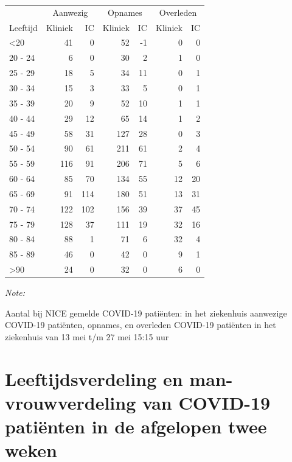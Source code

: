\documentclass[
  english,
  man,floatsintext]{apa6}
\begin{document}
\begin{table}
\centering\begingroup\fontsize{10}{12}\selectfont

\begin{threeparttable}
\begin{tabular}{lrrrrrr}
\toprule
\multicolumn{1}{c}{ } & \multicolumn{2}{c}{Aanwezig} & \multicolumn{2}{c}{Opnames} & \multicolumn{2}{c}{Overleden} \\
\cmidrule(l{3pt}r{3pt}){2-3} \cmidrule(l{3pt}r{3pt}){4-5} \cmidrule(l{3pt}r{3pt}){6-7}
Leeftijd & Kliniek & IC & Kliniek & IC & Kliniek & IC\\
\midrule
<20 & 41 & 0 & 52 & -1 & 0 & 0\\
20 - 24 & 6 & 0 & 30 & 2 & 1 & 0\\
25 - 29 & 18 & 5 & 34 & 11 & 0 & 1\\
30 - 34 & 15 & 3 & 33 & 5 & 0 & 1\\
35 - 39 & 20 & 9 & 52 & 10 & 1 & 1\\
40 - 44 & 29 & 12 & 65 & 14 & 1 & 2\\
45 - 49 & 58 & 31 & 127 & 28 & 0 & 3\\
50 - 54 & 90 & 61 & 211 & 61 & 2 & 4\\
55 - 59 & 116 & 91 & 206 & 71 & 5 & 6\\
60 - 64 & 85 & 70 & 134 & 55 & 12 & 20\\
65 - 69 & 91 & 114 & 180 & 51 & 13 & 31\\
70 - 74 & 122 & 102 & 156 & 39 & 37 & 45\\
75 - 79 & 128 & 37 & 111 & 19 & 32 & 16\\
80 - 84 & 88 & 1 & 71 & 6 & 32 & 4\\
85 - 89 & 46 & 0 & 42 & 0 & 9 & 1\\
>90 & 24 & 0 & 32 & 0 & 6 & 0\\
\bottomrule
\end{tabular}
\begin{tablenotes}
\item \textit{Note: } 
\item Aantal bij NICE gemelde COVID-19 patiënten: in het ziekenhuis aanwezige COVID-19 patiënten, opnames, en overleden COVID-19 patiënten in het ziekenhuis van 13 mei t/m 27 mei 15:15 uur
\end{tablenotes}
\end{threeparttable}
\endgroup{}
\end{table}

\newpage

\hypertarget{leeftijdsverdeling-en-man-vrouwverdeling-van-covid-19-patiuxebnten-in-de-afgelopen-twee-weken}{%
\section{Leeftijdsverdeling en man-vrouwverdeling van COVID-19 patiënten in de afgelopen twee weken}\label{leeftijdsverdeling-en-man-vrouwverdeling-van-covid-19-patiuxebnten-in-de-afgelopen-twee-weken}}
\end{document}
